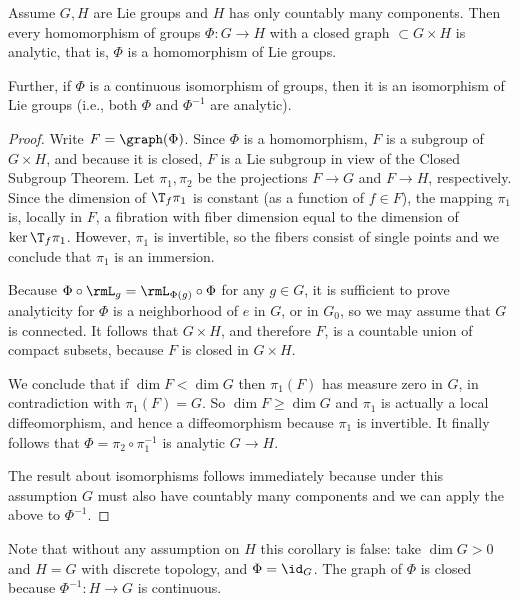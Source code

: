 \begin{cor}[{{\cite[Prop.~1.10.8]{DK}}}]
    Assume $G,H$ are Lie groups and $H$ has only countably many components. Then every homomorphism of groups $\Phi:G\to H$ with a closed graph $\subset G\times H$ is analytic, that is, $\Phi$ is a homomorphism of Lie groups.

    Further, if $\Phi$ is a continuous isomorphism of groups, then it is an isomorphism of Lie groups (i.e., both $\Phi$ and $\Phi^{-1}$ are analytic).
\end{cor}
\begin{proof}
    Write $F=\graph(\Phi)$. Since $\Phi$ is a homomorphism, $F$ is a subgroup of $G\times H$, and because it is closed, $F$ is a Lie subgroup in view of the Closed Subgroup Theorem. Let $\pi_1,\pi_2$ be the projections $F\to G$ and $F\to H$, respectively. Since the dimension of $\T_f\pi_1$ is constant (as a function of $f\in F$), the mapping $\pi_1$ is, locally in $F$, a fibration with fiber dimension equal to the dimension of $\ker \T_f\pi_1$. However, $\pi_1$ is invertible, so the fibers consist of single points and we conclude that $\pi_1$ is an immersion.

    Because $\Phi\circ \rmL_g=\rmL_{\Phi(g)}\circ\Phi$ for any $g\in G$, it is sufficient to prove analyticity for $\Phi$ is a neighborhood of $e$ in $G$, or in $G_0$, so we may assume that $G$ is connected. It follows that $G\times H$, and therefore $F$, is a countable union of compact subsets, because $F$ is closed in $G\times H$.

    We conclude that if $\dim F<\dim G$ then $\pi_1(F)$ has measure zero in $G$, in contradiction with $\pi_1(F)=G$. So $\dim F\geq \dim G$ and $\pi_1$ is actually a local diffeomorphism, and hence a diffeomorphism because $\pi_1$ is invertible. It finally follows that $\Phi=\pi_2\circ\pi_1^{-1}$ is analytic $G\to H$.

    The result about isomorphisms follows immediately because under this assumption $G$ must also have countably many components and we can apply the above to $\Phi^{-1}$.
\end{proof}

\begin{rem}
    Note that without any assumption on $H $ this corollary is false: take $\dim G>0$ and $H=G$ with discrete topology, and $\Phi=\id_G$. The graph of $\Phi$ is closed because $\Phi^{-1}:H\to G$ is continuous.
\end{rem}


